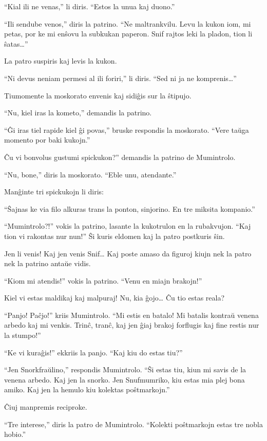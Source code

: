 ``Kial ili ne venas,'' li diris. ``Estos la unua kaj duono.''

``Ili sendube venos,'' diris la patrino. ``Ne maltrankvilu. Levu la kukon iom, mi petas, por ke mi enŝovu la subkukan paperon. Snif rajtos leki la pladon, tion li ŝatas{\ldots}''

La patro suspiris kaj levis la kukon.

``Ni devus neniam permesi al ili foriri,'' li diris. ``Sed ni ja ne komprenis{\ldots}''

Tiumomente la moskorato envenis kaj sidiĝis sur la ŝtipujo.

``Nu, kiel iras la kometo,'' demandis la patrino.

``Ĝi iras tiel rapide kiel ĝi povas,'' bruske respondis la moskorato. ``Vere taŭga momento por baki kukojn.''

Ĉu vi bonvolus gustumi spickukon?'' demandis la patrino de Mumintrolo.

``Nu, bone,'' diris la moskorato. ``Eble unu, atendante.''

Manĝinte tri spickukojn li diris:

``Ŝajnas ke via filo alkuras trans la ponton, sinjorino. En tre miksita kompanio.''

``Mumintrolo?!'' vokis la patrino, lasante la kukotrulon en la rubakvujon. ``Kaj tion vi rakontas nur nun!'' Ŝi kuris eldomen kaj la patro postkuris ŝin.

Jen li venis! Kaj jen venis Snif{\ldots} Kaj poste amaso da figuroj kiujn nek la patro nek la patrino antaŭe vidis.

``Kiom mi atendis!'' vokis la patrino. ``Venu en miajn brakojn!''

Kiel vi estas maldikaj kaj malpuraj! Nu, kia ĝojo{\ldots} Ĉu tio estas reala?

``Panjo! Paĉjo!'' kriis Mumintrolo. ``Mi estis en batalo! Mi batalis kontraŭ venena arbedo kaj mi venkis. Trinĉ, tranĉ, kaj jen ĝiaj brakoj forflugis kaj fine restis nur la stumpo!''

``Ke vi kuraĝis!'' ekkriis la panjo. ``Kaj kiu do estas tiu?''

``Jen Snorkfraŭlino,'' respondis Mumintrolo. ``Ŝi estas tiu, kiun mi savis de la venena arbedo. Kaj jen la snorko. Jen Snufmumriko, kiu estas mia plej bona amiko. Kaj jen la hemulo kiu kolektas poŝtmarkojn.''

Ĉiuj manpremis reciproke.

``Tre interese,'' diris la patro de Mumintrolo. ``Kolekti poŝtmarkojn estas tre nobla hobio.''


